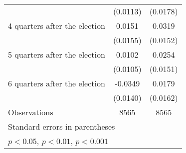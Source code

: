 \begin{table}[htbp]
\begin{tabular}{l*{2}{c}}
                    &    (0.0113)         &    (0.0178)         \\
[1em]
 4 quarters after the election&      0.0151         &      0.0319\sym{*}  \\
                    &    (0.0155)         &    (0.0152)         \\
[1em]
 5 quarters after the election&      0.0102         &      0.0254         \\
                    &    (0.0105)         &    (0.0151)         \\
[1em]
 6 quarters after the election&     -0.0349\sym{*}  &      0.0179         \\
                    &    (0.0140)         &    (0.0162)         \\
\hline
Observations        &        8565         &        8565         \\
\hline\hline
\multicolumn{3}{l}{\footnotesize Standard errors in parentheses}\\
\multicolumn{3}{l}{\footnotesize \sym{*} \(p<0.05\), \sym{**} \(p<0.01\), \sym{***} \(p<0.001\)}\\
\end{tabular}
\end{table}
